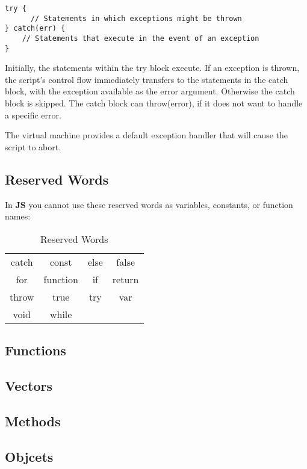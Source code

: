 \begin{lstlisting}[language=uJS]
try {
	  // Statements in which exceptions might be thrown
} catch(err) {
	// Statements that execute in the event of an exception
}
\end{lstlisting}

Initially, the statements within the try block execute. If an exception is thrown, the script's control flow immediately transfers to the statements in the catch block, with the exception available as the error argument. Otherwise the catch block is skipped. The catch block can throw(error), if it does not want to handle a specific error.

The virtual machine provides a default exception handler that will cause the script to abort.

\subsection{Reserved Words}

In \textbf{\textmu JS} you cannot use these reserved words as variables, constants, or function names:

\begin{table}[H]
\begin{tabular}{ c c c c }
	\toprule
	catch & const	 & else	& false\\
	for	  & function & if	& return\\
	throw &	true     & try	& var\\	
	void  & while    &      & \\
	\bottomrule
\end{tabular}
\centering
\caption{Reserved Words}
\label{tab:reserved-words}
\end{table} 

\subsection {Functions}

\subsection {Vectors}

\subsection {Methods}

\subsection {Objcets}

